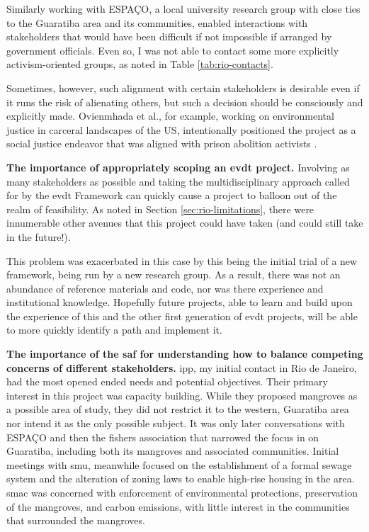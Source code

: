 Similarly working with ESPAÇO, a local university research group with close ties to the Guaratiba area and its communities, enabled interactions with stakeholders that would have been difficult if not impossible if arranged by government officials. Even so, I was not able to contact some more explicitly activism-oriented groups, as noted in Table \ref{tab:rio-contacts}.

Sometimes, however, such alignment with certain stakeholders is desirable even if it runs the risk of alienating others, but such a decision should be consciously and explicitly made. Ovienmhada et al., for example, working on environmental justice in carceral landscapes of the US, intentionally positioned the project as a social justice endeavor that was aligned with prison abolition activists \cite{ovienmhadaEnvironmentVulnerabilityDecisionTechnologyModelingFramework2021}. 

\textbf{The importance of appropriately scoping an \ac{evdt} project.} Involving as many stakeholders as possible and taking the multidisciplinary approach called for by the \ac{evdt} Framework can quickly cause a project to balloon out of the realm of feasibility. As noted in Section \ref{sec:rio-limitations}, there were innumerable other avenues that this project could have taken (and could still take in the future!). 

This problem was exacerbated in this case by this being the initial trial of a new framework, being run by a new research group. As a result, there was not an abundance of reference materials and code, nor was there experience and institutional knowledge. Hopefully future projects, able to learn and build upon the experience of this and the other first generation of \ac{evdt} projects, will be able to more quickly identify a path and implement it.

\textbf{The importance of the \ac{saf} for understanding how to balance competing concerns of different stakeholders.} \ac{ipp}, my initial contact in Rio de Janeiro, had the most opened ended needs and potential objectives. Their primary interest in this project was capacity building. While they proposed mangroves as a possible area of study, they did not restrict it to the western, Guaratiba area nor intend it as the only possible subject. It was only later conversations with ESPAÇO and then the fishers association that narrowed the focus in on Guaratiba, including both its mangroves and associated communities. Initial meetings with \ac{smu}, meanwhile focused on the establishment of a formal sewage system and the alteration of zoning laws to enable high-rise housing in the area. \ac{smac} was concerned with enforcement of environmental protections, preservation of the mangroves, and carbon emissions, with little interest in the communities that surrounded the mangroves. 

